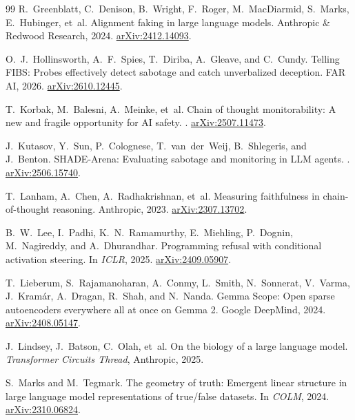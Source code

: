 \documentclass[10pt,twocolumn]{article}
\begin{document}
\begin{thebibliography}{99}
R.~Greenblatt, C.~Denison, B.~Wright, F.~Roger, M.~MacDiarmid, S.~Marks, E.~Hubinger, et~al.
\newblock Alignment faking in large language models.
\newblock Anthropic \& Redwood Research, 2024. \href{https://arxiv.org/abs/2412.14093}{arXiv:2412.14093}.

O.~J.~Hollinsworth, A.~F.~Spies, T.~Diriba, A.~Gleave, and C.~Cundy.
\newblock Telling FIBS: Probes effectively detect sabotage and catch unverbalized deception.
\newblock FAR AI, 2026. \href{https://arxiv.org/abs/2610.12445}{arXiv:2610.12445}.

T.~Korbak, M.~Balesni, A.~Meinke, et~al.
\newblock Chain of thought monitorability: A new and fragile opportunity for AI safety.
. \href{https://arxiv.org/abs/2507.11473}{arXiv:2507.11473}.

J.~Kutasov, Y.~Sun, P.~Colognese, T.~van~der~Weij, B.~Shlegeris, and J.~Benton.
\newblock SHADE-Arena: Evaluating sabotage and monitoring in LLM agents.
. \href{https://arxiv.org/abs/2506.15740}{arXiv:2506.15740}.

T.~Lanham, A.~Chen, A.~Radhakrishnan, et~al.
\newblock Measuring faithfulness in chain-of-thought reasoning.
\newblock Anthropic, 2023. \href{https://arxiv.org/abs/2307.13702}{arXiv:2307.13702}.

B.~W.~Lee, I.~Padhi, K.~N.~Ramamurthy, E.~Miehling, P.~Dognin, M.~Nagireddy, and A.~Dhurandhar.
\newblock Programming refusal with conditional activation steering.
\newblock In \emph{ICLR}, 2025. \href{https://arxiv.org/abs/2409.05907}{arXiv:2409.05907}.

T.~Lieberum, S.~Rajamanoharan, A.~Conmy, L.~Smith, N.~Sonnerat, V.~Varma, J.~Kram\'ar, A.~Dragan, R.~Shah, and N.~Nanda.
\newblock Gemma Scope: Open sparse autoencoders everywhere all at once on Gemma 2.
\newblock Google DeepMind, 2024. \href{https://arxiv.org/abs/2408.05147}{arXiv:2408.05147}.

J.~Lindsey, J.~Batson, C.~Olah, et~al.
\newblock On the biology of a large language model.
\newblock \emph{Transformer Circuits Thread}, Anthropic, 2025.

S.~Marks and M.~Tegmark.
\newblock The geometry of truth: Emergent linear structure in large language model representations of true/false datasets.
\newblock In \emph{COLM}, 2024. \href{https://arxiv.org/abs/2310.06824}{arXiv:2310.06824}.


\end{thebibliography}
\end{document}
